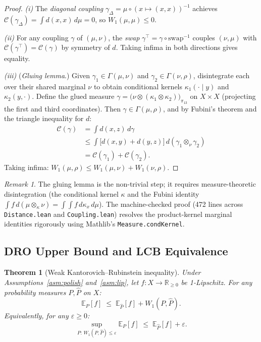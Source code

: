 \documentclass[11pt]{article}
\newtheorem{theorem}{Theorem}
\theoremstyle{definition}
\theoremstyle{remark}
\newtheorem{remark}{Remark}
\begin{document}
\begin{proof}
\textit{(i)} The \emph{diagonal coupling}
$\gamma_\Delta = \mu \circ (x \mapsto (x,x))^{-1}$ achieves
$\mathcal{C}(\gamma_\Delta) = \int d(x,x)\,d\mu = 0$, so $W_1(\mu,\mu) \leq 0$.

\textit{(ii)} For any coupling $\gamma$ of $(\mu,\nu)$, the \emph{swap}
$\gamma^\top = \gamma \circ \mathrm{swap}^{-1}$ couples $(\nu,\mu)$
with $\mathcal{C}(\gamma^\top) = \mathcal{C}(\gamma)$ by symmetry of $d$.
Taking infima in both directions gives equality.

\textit{(iii)} (\emph{Gluing lemma}.)
Given $\gamma_1 \in \Gamma(\mu,\nu)$ and $\gamma_2 \in \Gamma(\nu,\rho)$,
disintegrate each over their shared marginal $\nu$ to obtain conditional
kernels $\kappa_1(\cdot \mid y)$ and $\kappa_2(y, \cdot)$.
Define the glued measure
$\gamma = \bigl(\nu \otimes (\kappa_1 \otimes \kappa_2)\bigr)_{\pi_{13}}$
on $X \times X$ (projecting the first and third coordinates).
Then $\gamma \in \Gamma(\mu,\rho)$, and by Fubini's theorem
and the triangle inequality for $d$:
\begin{align*}
\mathcal{C}(\gamma)
&= \int d(x,z)\,d\gamma \\
&\leq \int \bigl[d(x,y)+d(y,z)\bigr]\,d(\gamma_1 \otimes_\nu \gamma_2) \\
&= \mathcal{C}(\gamma_1) + \mathcal{C}(\gamma_2).
\end{align*}
Taking infima: $W_1(\mu,\rho) \leq W_1(\mu,\nu) + W_1(\nu,\rho)$.
\end{proof}

\begin{remark}
The gluing lemma is the non-trivial step; it requires measure-theoretic
disintegration (the conditional kernel $\kappa$ and the Fubini identity
$\int f\,d(\mu \otimes_\kappa \nu) = \int\!\int f\,d\kappa_x\,d\mu$).
The machine-checked proof (472 lines across \texttt{Distance.lean} and
\texttt{Coupling.lean}) resolves the product-kernel marginal identities
rigorously using Mathlib's \texttt{Measure.condKernel}.
\end{remark}

\subsection{DRO Upper Bound and LCB Equivalence}

\begin{theorem}[Weak Kantorovich--Rubinstein inequality]\label{thm:dro}
Under Assumptions~\ref{asm:polish} and~\ref{asm:lip},
let $f:X\to\mathbb{R}_{\geq 0}$ be 1-Lipschitz.
For any probability measures $P, \hat{P}$ on $X$:
\begin{equation}
\mathbb{E}_P[f] \;\leq\; \mathbb{E}_{\hat{P}}[f] + W_1(P,\hat{P}).
\label{eq:wkr}
\end{equation}
Equivalently, for any $\varepsilon \geq 0$:
\begin{equation}
\sup_{P:\,W_1(P,\hat{P})\leq\varepsilon} \mathbb{E}_P[f]
\;\leq\; \mathbb{E}_{\hat{P}}[f] + \varepsilon.
\label{eq:dro_ub}
\end{equation}
\end{theorem}
\end{document}

